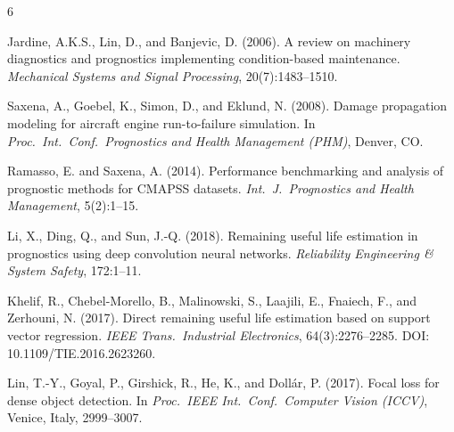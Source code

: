 \documentclass[10pt,twocolumn]{article}
\begin{document}

\begin{thebibliography}{6}

Jardine, A.K.S., Lin, D., and Banjevic, D. (2006).
A review on machinery diagnostics and prognostics implementing condition-based maintenance.
\textit{Mechanical Systems and Signal Processing}, 20(7):1483--1510.

Saxena, A., Goebel, K., Simon, D., and Eklund, N. (2008).
Damage propagation modeling for aircraft engine run-to-failure simulation.
In \textit{Proc.\ Int.\ Conf.\ Prognostics and Health Management (PHM)}, Denver, CO.

Ramasso, E. and Saxena, A. (2014).
Performance benchmarking and analysis of prognostic methods for CMAPSS datasets.
\textit{Int.\ J.\ Prognostics and Health Management}, 5(2):1--15.

Li, X., Ding, Q., and Sun, J.-Q. (2018).
Remaining useful life estimation in prognostics using deep convolution neural networks.
\textit{Reliability Engineering \& System Safety}, 172:1--11.

Khelif, R., Chebel-Morello, B., Malinowski, S., Laajili, E., Fnaiech, F., and
Zerhouni, N. (2017).
Direct remaining useful life estimation based on support vector regression.
\textit{IEEE Trans.\ Industrial Electronics}, 64(3):2276--2285.
DOI: 10.1109/TIE.2016.2623260.

Lin, T.-Y., Goyal, P., Girshick, R., He, K., and Doll\'ar, P. (2017).
Focal loss for dense object detection.
In \textit{Proc.\ IEEE Int.\ Conf.\ Computer Vision (ICCV)}, Venice, Italy, 2999--3007.

\end{thebibliography}
\end{document}

